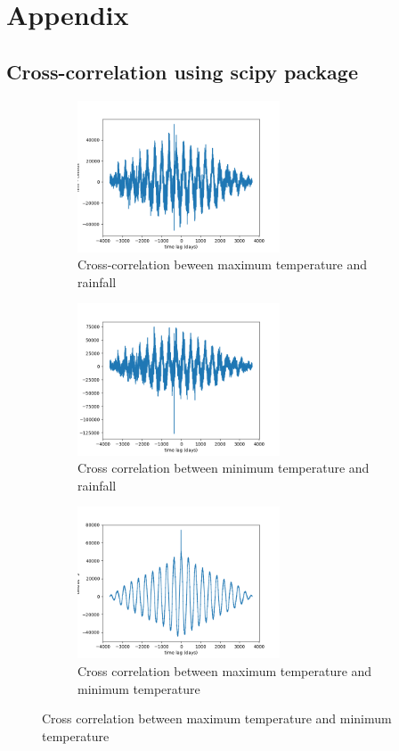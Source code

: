 \documentclass{article}
\begin{document}
\newpage
\section*{Appendix}
\subsection*{Cross-correlation using scipy package}
\begin{figure}[h!]
	\caption{Cross-correlation between each time-series using scipy.signal.correlate}
	\begin{subfigure}{\textwidth}
		\includegraphics[width=\linewidth, height=4.5cm]{figures/cross_correlation_max_temp_rainfall.png} 
		\caption{Cross-correlation beween maximum temperature and rainfall }
		\label{fig:cc_max_temp_rainfall_scipy.correlate}
	\end{subfigure}
	\begin{subfigure}{\textwidth}
		\includegraphics[width=\linewidth, height=4.5cm]{figures/cross_correlation_min_temp_rainfall.png}
		\caption{Cross correlation between minimum temperature and rainfall}	
		\label{fig:cc_min_temp_rainfall_scipy.correlate}
	\end{subfigure}
	\begin{subfigure}{\textwidth}
		\includegraphics[width=\linewidth, height=4.5cm]{figures/cross_correlation_max_temp_min_temp.png}
		\caption{Cross correlation between maximum temperature and minimum temperature}	
		\label{fig:cc_max_temp_min_temp_scipy.correlate}
	\end{subfigure}
	\label{fig:cross-correlation analysis scipy.signal.correlate}
\end{figure}
\newpage
\end{document}
